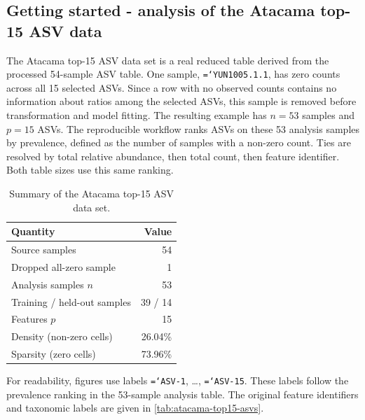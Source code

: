 \documentclass[11pt,a4paper]{article}
\newcommand{\code}[1]{\allowbreak\texttt{\hyphenchar\font=`\-\relax #1}}
\begin{document}
\subsection{Getting started - analysis of the Atacama top-15 ASV data}
\label{sec:lowdim-subset}
\label{sec:lowdim}

The Atacama top-15 ASV data set is a real reduced table derived from the
processed 54-sample ASV table. One sample,
\code{YUN1005.1.1}, has zero counts across all 15 selected ASVs. Since a row
with no observed counts contains no information about ratios among the selected
ASVs, this sample is removed before transformation and model fitting. The
resulting example has $n=53$ samples and $p=15$ ASVs. The reproducible workflow
ranks ASVs on these 53 analysis samples by prevalence, defined as the number
of samples with a non-zero count. Ties are resolved by total relative abundance,
then total count, then feature identifier. Both table sizes use this same ranking.

\begin{table}[!htbp]
\centering
\small
\caption{Summary of the Atacama top-15 ASV data set.}
\label{tab:lowdim-summary}
\begin{tabular}{@{}lr@{}}
\toprule
\textbf{Quantity} & \textbf{Value} \\
\midrule
Source samples & 54 \\
Dropped all-zero sample & 1 \\
Analysis samples $n$ & 53 \\
Training / held-out samples & 39 / 14 \\
Features $p$ & 15 \\
Density (non-zero cells) & 26.04\% \\
Sparsity (zero cells) & 73.96\% \\
\bottomrule
\end{tabular}
\end{table}

For readability, figures use labels \code{ASV-1}, \ldots, \code{ASV-15}.
These labels follow the prevalence ranking in the 53-sample analysis table. The
original feature identifiers and taxonomic labels are given in
\autoref{tab:atacama-top15-asvs}.
\end{document}

